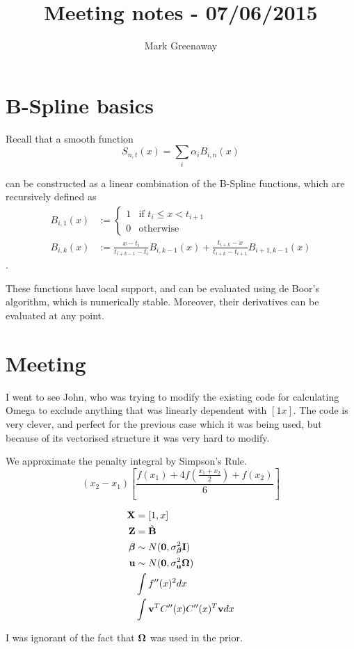\documentclass{article}[12pt]
\title{Meeting notes - 07/06/2015}
\author{Mark Greenaway}
\begin{document}
\maketitle

\section{B-Spline basics}

Recall that a smooth function
\[
	S_{n, t}(x) = \sum_i \alpha_i B_{i, n} (x)
\]

can be constructed as a linear combination of the B-Spline functions, which are recursively
defined as
\begin{align*}
	B_{i, 1} (x) &:= 
	\begin{cases}
		1 & \text{if } t_i \leq x < t_{i + 1} \\
		0 & \text{otherwise}
	\end{cases} \\
	B_{i, k} (x) &:= \frac{x - t_i}{t_{i + k - 1} - t_i} B_{i, k - 1}(x) +
									\frac{t_{i + k} - x}{t_{i + k} - t_{i + 1}} B_{i + 1, k - 1} (x)
\end{align*}.

These functions have local support, and can be evaluated using de Boor's algorithm,
which is numerically stable. Moreover, their derivatives can be evaluated at any point.

\section{Meeting}

I went to see John, who was trying to modify the existing code for calculating Omega
to exclude anything that was linearly dependent with $[1 x]$. The code is very clever,
and perfect for the previous case which it was being used, but because of its vectorised
structure it was very hard to modify.

We approximate the penalty integral by Simpson's Rule.
\[
	(x_2 - x_1) \left [\frac{f(x_1) + 4 f(\frac{x_1 + x_2}{2}) + f(x_2)}{6} \right ]
\]

\begin{align*}
	{\bf X} &= [1, x] \\
	{\bf Z} &= \tilde {{\bf B}} \\
	{\boldsymbol \beta} &\sim N({\bf 0}, \sigma_{\boldsymbol \beta}^2 {\bf I}) \\
	{\bf u} &\sim N({\bf 0}, \sigma_{\bf u}^2 {\boldsymbol \Omega}) \\
	&\int f''(x)^2 dx \\
	&\int {\bf v}^T C''(x) C''(x)^T {\bf v} dx
\end{align*}

I was ignorant of the fact that ${\boldsymbol \Omega}$ was used in the prior.
\end{document}
